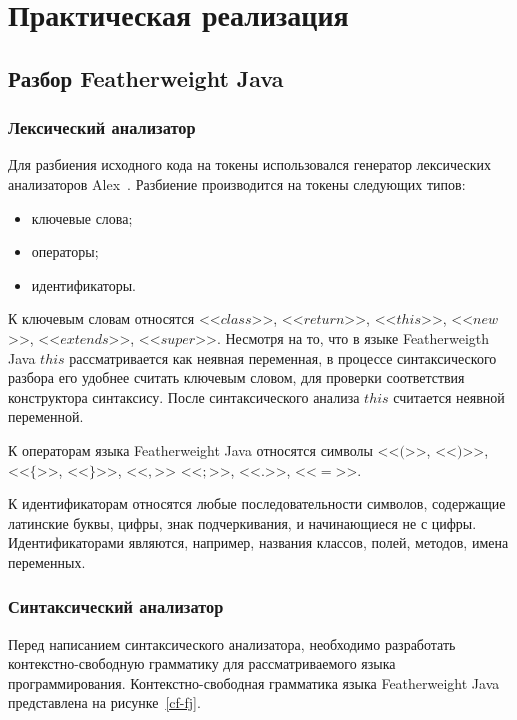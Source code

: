 \chapter{Практическая реализация}
\section{Разбор Featherweight Java}
\subsection{Лексический анализатор}
Для разбиения исходного кода на токены использовался генератор лексических анализаторов Alex~\cite{alex}.
Разбиение производится на токены следующих типов:
\begin{itemize}
    \item ключевые слова;
    \item операторы;
    \item идентификаторы.
\end{itemize}

К ключевым словам относятся <<$class$>>, <<$return$>>, <<$this$>>, <<$new$>>, <<$extends$>>, <<$super$>>.
Несмотря на то, что в языке Featherweigth Java $this$ рассматривается как неявная переменная,
в процессе синтаксического разбора его удобнее считать ключевым словом, для проверки соответствия конструктора синтаксису.
После синтаксического анализа $this$ считается неявной переменной.

К операторам языка Featherweight Java относятся символы <<$($>>, <<$)$>>, <<$\{$>>, <<$\}$>>, <<$,$>> <<$;$>>, <<$.$>>, <<$=$>>.

К идентификаторам относятся любые последовательности символов, содержащие латинские буквы, цифры, знак подчеркивания, и начинающиеся не с цифры.
Идентификаторами являются, например, названия классов, полей, методов, имена переменных.
\subsection{Синтаксический анализатор}
Перед написанием синтаксического анализатора, необходимо разработать контекстно-свободную грамматику для рассматриваемого языка программирования.
Контекстно-свободная грамматика языка Featherweight Java представлена на рисунке~\ref{cf-fj}.

